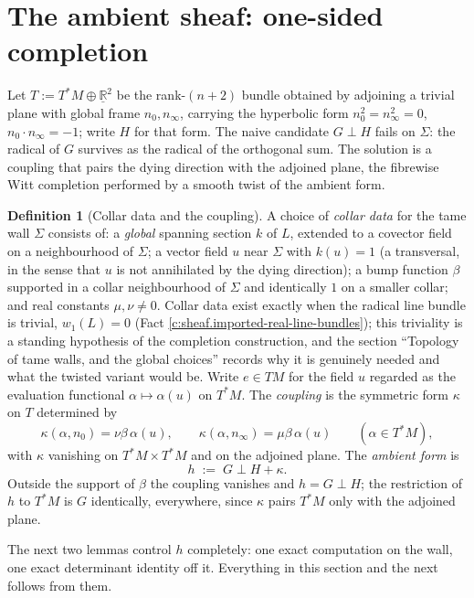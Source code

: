 \documentclass[11pt]{article}
\theoremstyle{definition}
\newtheorem{definition}[theorem]{Definition}
\theoremstyle{plain}
\providecommand{\R}{}\renewcommand{\R}{\mathbb{R}}
\providecommand{\Sig}{}\renewcommand{\Sig}{\Sigma}
\providecommand{\nInf}{}\renewcommand{\nInf}{n_\infty}
\providecommand{\nO}{}\renewcommand{\nO}{n_0}
\providecommand{\shL}{}\renewcommand{\shL}{L}
\begin{document}
\section{The ambient sheaf: one-sided completion}

\label{c:note.sheaf.setting-ambient-sheaf-one-sided-completion}
Let $T := T^*M \oplus \underline{\R}^2$ be the rank-$(n{+}2)$ bundle obtained by adjoining a trivial plane with global frame $\nO, \nInf$, carrying the hyperbolic form $\nO^2 = \nInf^2 = 0$, $\nO \cdot \nInf = -1$; write $H$ for that form. The naive candidate $G \perp H$ fails on $\Sig$: the radical of $G$ survives as the radical of the orthogonal sum. The solution is a coupling that pairs the dying direction with the adjoined plane, the fibrewise Witt completion performed by a smooth twist of the ambient form.

\begin{definition}[Collar data and the coupling]\label{c:obj.sheaf.collar-data-coupling}
A choice of \emph{collar data} for the tame wall $\Sig$ consists of: a \emph{global} spanning section $k$ of $\shL$, extended to a covector field on a neighbourhood of $\Sig$; a vector field $u$ near $\Sig$ with $k(u) = 1$ (a transversal, in the sense that $u$ is not annihilated by the dying direction); a bump function $\beta$ supported in a collar neighbourhood of $\Sig$ and identically $1$ on a smaller collar; and real constants $\mu, \nu \neq 0$. Collar data exist exactly when the radical line bundle is trivial, $w_1(\shL) = 0$ (Fact \ref{c:sheaf.imported-real-line-bundles}); this triviality is a standing hypothesis of the completion construction, and the section ``Topology of tame walls, and the global choices'' records why it is genuinely needed and what the twisted variant would be. Write $e \in TM$ for the field $u$ regarded as the evaluation functional $\alpha \mapsto \alpha(u)$ on $T^*M$. The \emph{coupling} is the symmetric form $\kappa$ on $T$ determined by
\[
\kappa(\alpha, \nO) = \nu\beta\,\alpha(u), \qquad \kappa(\alpha, \nInf) = \mu\beta\,\alpha(u) \qquad (\alpha \in T^*M),
\]
with $\kappa$ vanishing on $T^*M \times T^*M$ and on the adjoined plane. The \emph{ambient form} is
\[
h \;:=\; G \perp H + \kappa .
\]
Outside the support of $\beta$ the coupling vanishes and $h = G \perp H$; the restriction of $h$ to $T^*M$ is $G$ identically, everywhere, since $\kappa$ pairs $T^*M$ only with the adjoined plane.
\end{definition}

\label{c:note.sheaf.setting-ambient-sheaf-one-sided-completion-2}
The next two lemmas control $h$ completely: one exact computation on the wall, one exact determinant identity off it. Everything in this section and the next follows from them.
\end{document}
